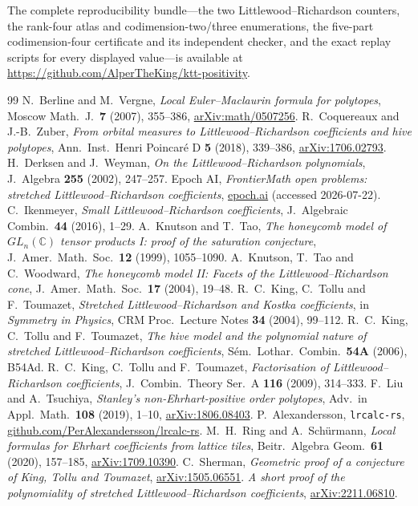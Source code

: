 \documentclass[11pt]{amsart}
\theoremstyle{definition}
\begin{document}
The complete reproducibility bundle---the two Littlewood--Richardson counters,
the rank-four atlas and codimension-two/three enumerations, the five-part
codimension-four certificate and its independent checker, and the exact replay
scripts for every displayed value---is available at
\url{https://github.com/AlperTheKing/ktt-positivity}.

\begin{thebibliography}{99}
 N.~Berline and M.~Vergne, \emph{Local Euler--Maclaurin
formula for polytopes}, Moscow Math.\ J.\ \textbf{7} (2007), 355--386,
\href{https://arxiv.org/abs/math/0507256}{arXiv:math/0507256}.
 R.~Coquereaux and J.-B.~Zuber, \emph{From orbital measures to
Littlewood--Richardson coefficients and hive polytopes}, Ann.\ Inst.\ Henri
Poincar\'e D \textbf{5} (2018), 339--386,
\href{https://arxiv.org/abs/1706.02793}{arXiv:1706.02793}.
 H.~Derksen and J.~Weyman, \emph{On the
Littlewood--Richardson polynomials}, J.\ Algebra \textbf{255} (2002), 247--257.
 Epoch AI, \emph{FrontierMath open problems: stretched
Littlewood--Richardson coefficients},
\href{https://epoch.ai/frontiermath/open-problems/stretched-lr-coefficients}{epoch.ai}
(accessed 2026-07-22).
 C.~Ikenmeyer, \emph{Small Littlewood--Richardson
coefficients}, J.\ Algebraic Combin.\ \textbf{44} (2016), 1--29.
 A.~Knutson and T.~Tao, \emph{The honeycomb model of
$GL_n(\mathbb{C})$ tensor products I: proof of the saturation conjecture},
J.\ Amer.\ Math.\ Soc.\ \textbf{12} (1999), 1055--1090.
 A.~Knutson, T.~Tao and C.~Woodward, \emph{The honeycomb model II:
Facets of the Littlewood--Richardson cone}, J.\ Amer.\ Math.\ Soc.\ \textbf{17}
(2004), 19--48.
 R.~C.~King, C.~Tollu and F.~Toumazet, \emph{Stretched
Littlewood--Richardson and Kostka coefficients}, in \emph{Symmetry in Physics},
CRM Proc.\ Lecture Notes \textbf{34} (2004), 99--112.
 R.~C.~King, C.~Tollu and F.~Toumazet, \emph{The hive model and
the polynomial nature of stretched Littlewood--Richardson coefficients},
S\'em.\ Lothar.\ Combin.\ \textbf{54A} (2006), B54Ad.
 R.~C.~King, C.~Tollu and F.~Toumazet, \emph{Factorisation of
Littlewood--Richardson coefficients}, J.\ Combin.\ Theory Ser.\ A \textbf{116}
(2009), 314--333.
 F.~Liu and A.~Tsuchiya, \emph{Stanley's non-Ehrhart-positive
order polytopes}, Adv.\ in Appl.\ Math.\ \textbf{108} (2019), 1--10,
\href{https://arxiv.org/abs/1806.08403}{arXiv:1806.08403}.
 P.~Alexandersson, \texttt{lrcalc-rs},
\href{https://github.com/PerAlexandersson/lrcalc-rs}{github.com/PerAlexandersson/lrcalc-rs}.
 M.~H.~Ring and A.~Sch\"urmann, \emph{Local formulas for
Ehrhart coefficients from lattice tiles}, Beitr.\ Algebra Geom.\ \textbf{61}
(2020), 157--185, \href{https://arxiv.org/abs/1709.10390}{arXiv:1709.10390}.
 C.~Sherman, \emph{Geometric proof of a conjecture of King,
Tollu and Toumazet}, \href{https://arxiv.org/abs/1505.06551}{arXiv:1505.06551}.
 \emph{A short proof of the polynomiality of stretched
Littlewood--Richardson coefficients},
\href{https://arxiv.org/abs/2211.06810}{arXiv:2211.06810}.
\end{thebibliography}
\end{document}
